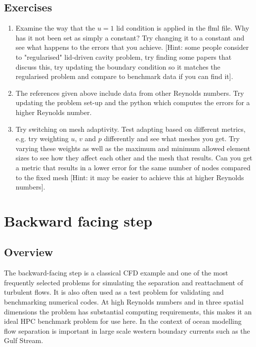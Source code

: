 \subsection{Exercises}
\begin{enumerate}
\item Examine the way that the $u=1$ lid condition is applied in the flml file. Why has it not been set as simply a constant?
Try changing it to a constant and see what happens to the errors that you achieve. [Hint: some people consider to "regularised" 
lid-driven cavity problem, try finding some papers that discuss this, try updating the boundary condition so it matches the 
regularised problem and compare to benchmark data if you can find it].
\item The references given above include data from other Reynolds numbers. Try updating the problem set-up and the python which computes
the errors for a higher Reynolds number.
\item Try switching on mesh adaptivity. Test adapting based on different metrics, e.g. try weighting $u$, $v$ and $p$
differently and see what meshes you get. Try varying these weights as well as the maximum and minimum allowed element
sizes to see how they affect each other and the mesh that results. Can you get a metric that results in a lower
error for the same number of nodes compared to the fixed mesh [Hint: it may be easier to achieve this at higher Reynolds numbers].
\end{enumerate}



\section{Backward facing step}
\label{sect:backward_facing_step}


\subsection{Overview}
The backward-facing step is a classical CFD example and one of the most frequently selected
problems for simulating the separation and reattachment of turbulent flows.
It is also often used as a test problem for validating and benchmarking numerical codes.
At high Reynolds numbers and in three spatial dimensions the problem has substantial
computing requirements, this makes it an ideal HPC benchmark problem for use here.
In the context of ocean modelling flow separation is important
in large scale western boundary currents such as the Gulf Stream.

